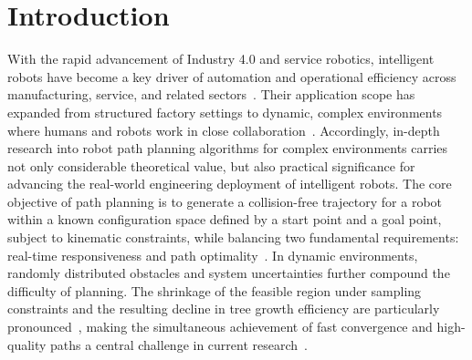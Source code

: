 \documentclass[sn-mathphys-num]{sn-jnl}%
\begin{document}
\section{Introduction}\label{sec1}

With the rapid advancement of Industry 4.0 and service robotics, intelligent robots have become a key driver of automation and operational efficiency across manufacturing, service, and related sectors~\cite{zhong2017intelligent,wirtz2018brave,mac2016heuristic}. Their application scope has expanded from structured factory settings to dynamic, complex environments where humans and robots work in close collaboration~\cite{ajoudani2018progress,villani2018survey}. Accordingly, in-depth research into robot path planning algorithms for complex environments carries not only considerable theoretical value, but also practical significance for advancing the real-world engineering deployment of intelligent robots. The core objective of path planning is to generate a collision-free trajectory for a robot within a known configuration space defined by a start point and a goal point, subject to kinematic constraints, while balancing two fundamental requirements: real-time responsiveness and path optimality~\cite{lavalle2006planning,latombe2012robot}. In dynamic environments, randomly distributed obstacles and system uncertainties further compound the difficulty of planning. The shrinkage of the feasible region under sampling constraints and the resulting decline in tree growth efficiency are particularly pronounced~\cite{kingston2018sampling}, making the simultaneous achievement of fast convergence and high-quality paths a central challenge in current research~\cite{mohanan2018survey, aggarwal2020path}.
\end{document}
